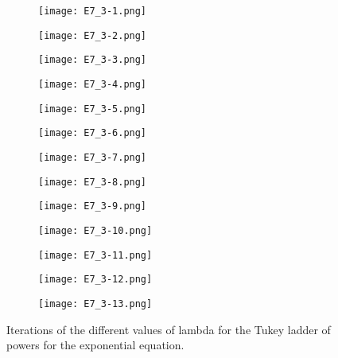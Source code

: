 \documentclass{article}
\begin{document}
\begin{figure}[]
\begin{subfigure}{.23\textwidth}
  \centering
  \texttt{[image: E7\_3-1.png]}  
  \caption{ }
  \label{sb7-1}
\end{subfigure}
\begin{subfigure}{.23\textwidth}
  \centering
  \texttt{[image: E7\_3-2.png]}  
  \caption{ }
  \label{sb7-2}
\end{subfigure}
\begin{subfigure}{.23\textwidth}
  \centering
  \texttt{[image: E7\_3-3.png]}  
  \caption{ }
  \label{sb7-3}
\end{subfigure}
\begin{subfigure}{.23\textwidth}
  \centering
  \texttt{[image: E7\_3-4.png]}  
  \caption{ }
  \label{sb7-4}
\end{subfigure}
\newline
\begin{subfigure}{.23\textwidth}
  \centering
  \texttt{[image: E7\_3-5.png]}  
  \caption{ }
  \label{sb7-5}
\end{subfigure}
\begin{subfigure}{.23\textwidth}
  \centering
  \texttt{[image: E7\_3-6.png]}  
  \caption{ }
  \label{sb7-6}
\end{subfigure}
\begin{subfigure}{.23\textwidth}
  \centering
  \texttt{[image: E7\_3-7.png]}  
  \caption{ }
  \label{sb7-7}
\end{subfigure}
\begin{subfigure}{.23\textwidth}
  \centering
  \texttt{[image: E7\_3-8.png]}  
  \caption{ }
  \label{sb7-8}
\end{subfigure}
\newline
\begin{subfigure}{.23\textwidth}
  \centering
  \texttt{[image: E7\_3-9.png]}  
  \caption{ }
  \label{sb7-9}
\end{subfigure}
\begin{subfigure}{.23\textwidth}
  \centering
  \texttt{[image: E7\_3-10.png]}  
  \caption{ }
  \label{sb7-10}
\end{subfigure}
\begin{subfigure}{.23\textwidth}
  \centering
  \texttt{[image: E7\_3-11.png]}  
  \caption{ }
  \label{sb7-11}
\end{subfigure}
\begin{subfigure}{.23\textwidth}
  \centering
  \texttt{[image: E7\_3-12.png]}  
  \caption{ }
  \label{sb7-12}
\end{subfigure}
\newline
\begin{subfigure}{1\textwidth}
  \centering
  \texttt{[image: E7\_3-13.png]}  
  \caption{ }
  \label{sb7-13}
\end{subfigure}
\caption{Iterations of the different values of lambda for the Tukey ladder of powers for the exponential equation.}
\label{fig7}
\end{figure}
\end{document}
